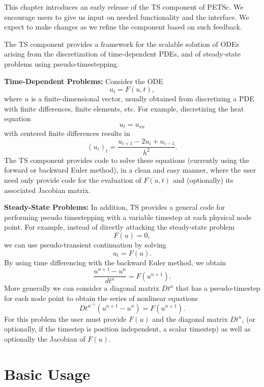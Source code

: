 This chapter introduces an early release of the TS component of PETSc.
We encourage users to give us input on needed functionality and the
interface.  We expect to make changes as we refine the component based
on such feedback.

\medskip \medskip

The TS component provides a framework for the scalable solution of ODEs
arising from the discretization of time-dependent PDEs, and of
steady-state problems using pseudo-timestepping.

\vspace{.2cm}

\noindent
{\bf Time-Dependent Problems:} Consider the ODE
\[
              u_t = F(u,t),
\]
where $ u $ is a finite-dimensional vector, usually obtained from
discretizing a PDE with finite differences, finite elements, etc.
For example, discretizing the heat equation 
\[
          u_t = u_{xx} 
\]
with centered finite differences results in 
\[
          (u_i)_t = \frac{u_{i+1} - 2 u_{i} + u_{i-1}}{h^2}.
\]
The TS component provides code to solve these equations (currently 
using the forward or backward Euler method), in a clean and easy manner,
where the user need only provide code for the evaluation of $F(u,t)$ and 
(optionally) its associated Jacobian matrix.

\vspace{.2cm}

\noindent
{\bf Steady-State Problems:} 
In addition, TS provides a general code for performing pseudo timestepping
with a variable timestep at each physical node point. For example, instead of
directly attacking the steady-state problem
\[
           F(u) = 0,
\]
we can use pseudo-transient continuation by solving
\[
           u_t = F(u).
\]
By using time differencing with the backward Euler method, we obtain
\[
           \frac{u^{n+1} - u^{n}}{dt^{n}} = F(u^{n+1}).
\]
More generally we can consider a diagonal matrix $ Dt^{n} $ that has a
pseudo-timestep for each node point to obtain the series of nonlinear equations
\[
        Dt^{n^{-1}}(u^{n+1} - u^{n}) =  F(u^{n+1}).
\]
For this problem the user must provide $ F(u)$ and the diagonal 
matrix $ Dt^{n}$, (or optionally, if the timestep is position independent,
a scalar timestep) as well as optionally the Jacobian of $ F(u)$.

\section{Basic Usage}


